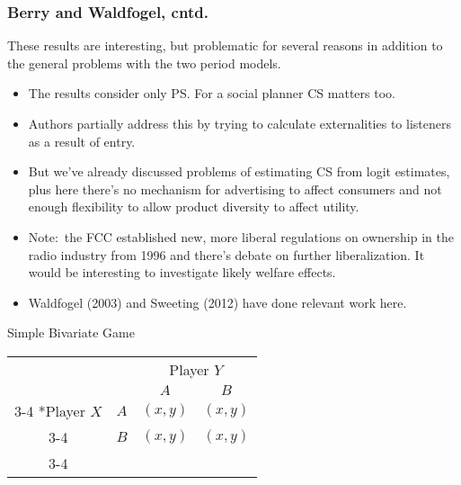 \documentclass[xcolor=pdftex,dvipsnames,table,mathserif]{beamer}
\begin{document}
\begin{frame}
\frametitle{Berry and Waldfogel, cntd.}
These results are interesting, but problematic for several reasons in
addition to the general problems with the two period models.
\begin{itemize}
\item The results consider only PS. For a social planner CS matters too.
\item Authors partially address this by trying to calculate externalities to
listeners as a result of entry.
\item But we've already discussed problems of estimating CS from logit
estimates, plus here there's no mechanism for advertising to affect
consumers and not enough flexibility to allow product diversity to affect
utility.
\item Note:\ the FCC established new, more liberal regulations on ownership
in the radio industry from 1996 and there's debate on further
liberalization. It would be interesting to investigate likely welfare
effects.
\item Waldfogel (2003) and Sweeting (2012) have done relevant work here.
\end{itemize}
\end{frame}

\begin{frame}{Simple Bivariate Game}
  \begin{table}
    \setlength{\extrarowheight}{2pt}
    \begin{tabular}{cc|c|c|}
      & \multicolumn{1}{c}{} & \multicolumn{2}{c}{Player $Y$}\\
      & \multicolumn{1}{c}{} & \multicolumn{1}{c}{$A$}  & \multicolumn{1}{c}{$B$} \\\cline{3-4}
      \multirow{2}*{Player $X$}  & $A$ & $(x,y)$ & $(x,y)$ \\\cline{3-4}
      & $B$ & $(x,y)$ & $(x,y)$ \\\cline{3-4}
    \end{tabular}
  \end{table}

\end{frame}
\end{document}
